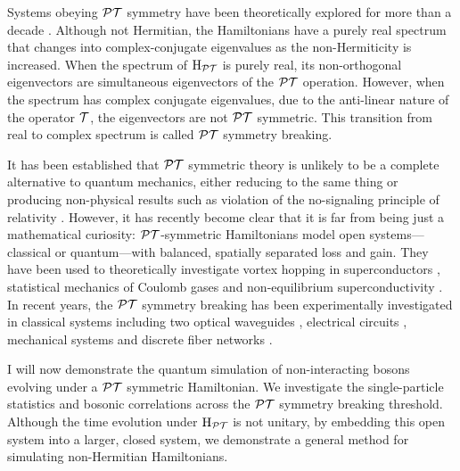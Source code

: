 Systems obeying \(\mathcal{PT}\) symmetry have been theoretically explored for more than
a decade \cite{bender98, levai-jphysa-33-7165, bender07}. Although not
Hermitian, the Hamiltonians have a purely real spectrum that changes into
complex-conjugate eigenvalues as the non-Hermiticity is increased. When the
spectrum of \(\mathrm{H}_{\mathcal{PT}{}}\) is purely real, its non-orthogonal
eigenvectors are simultaneous eigenvectors of the \(\mathcal{PT}{}\) operation. However,
when the spectrum has complex conjugate eigenvalues, due to the anti-linear
nature of the operator \(\mathcal{T}\), the eigenvectors are not \(\mathcal{PT}{}\)
symmetric. This transition from real to complex spectrum is called \(\mathcal{PT}{}\)
symmetry breaking. 

It has been established that \(\mathcal{PT}{}\) symmetric theory is unlikely to be a
complete alternative to quantum mechanics, either reducing to the same thing
\cite{mostafazadeh-jmathphys-43-205} or producing non-physical results such as
violation of the no-signaling principle of relativity \cite{lee-prl-112-130404}.
However, it has recently become clear that it is far from being just a
mathematical curiosity: \(\mathcal{PT}{}\)-symmetric Hamiltonians model open
systems---classical or quantum---with balanced, spatially separated loss and
gain. They have been used to theoretically investigate vortex hopping in
superconductors \cite{naomichi-physrevlett-77-570},
statistical mechanics of Coulomb gases \cite{gulden-jetp-117-517} and
non-equilibrium superconductivity \cite{rubinstein-physrevlett-99-167003,
serbyn-physrevb-87-020501}. In recent years, the \(\mathcal{PT}{}\)
symmetry breaking has been experimentally investigated in classical systems
including two optical waveguides \cite{pt-ruter}, electrical circuits
\cite{schindler-physreva-84-040101}, mechanical systems
\cite{bender-amjphys-81-173} and discrete fiber networks
\cite{pt-regensburger}.

I will now demonstrate the quantum simulation of non-interacting bosons
evolving under a \(\mathcal{PT}{}\) symmetric
Hamiltonian. We investigate the single-particle statistics and bosonic
correlations across the \(\mathcal{PT}{}\) symmetry breaking threshold. Although the time
evolution under \(\mathrm{H}_{\mathcal{PT}{}}\) is not unitary, by embedding this open
system into a larger, closed system, we demonstrate a general method for
simulating non-Hermitian Hamiltonians.


